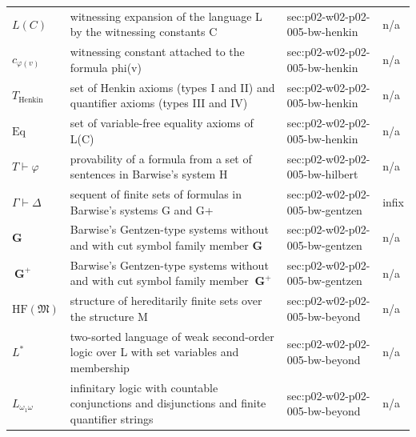 \begin{longtable}{@{}p{}p{}p{}p{}@{}}
\(L(C)\) & witnessing expansion of the language L by the witnessing constants C & sec:\allowbreak{}p02-\allowbreak{}w02-\allowbreak{}p02-\allowbreak{}005-\allowbreak{}bw-\allowbreak{}henkin & n/a \\
\(c_{\varphi(v)}\) & witnessing constant attached to the formula phi(v) & sec:\allowbreak{}p02-\allowbreak{}w02-\allowbreak{}p02-\allowbreak{}005-\allowbreak{}bw-\allowbreak{}henkin & n/a \\
\(T_{\mathrm{Henkin}}\) & set of Henkin axioms (types I and II) and quantifier axioms (types III and IV) & sec:\allowbreak{}p02-\allowbreak{}w02-\allowbreak{}p02-\allowbreak{}005-\allowbreak{}bw-\allowbreak{}henkin & n/a \\
\(\mathrm{Eq}\) & set of variable-free equality axioms of L(C) & sec:\allowbreak{}p02-\allowbreak{}w02-\allowbreak{}p02-\allowbreak{}005-\allowbreak{}bw-\allowbreak{}henkin & n/a \\
\(T\vdash\varphi\) & provability of a formula from a set of sentences in Barwise's system H & sec:\allowbreak{}p02-\allowbreak{}w02-\allowbreak{}p02-\allowbreak{}005-\allowbreak{}bw-\allowbreak{}hilbert & n/a \\
\(\Gamma\vdash\Delta\) & sequent of finite sets of formulas in Barwise's systems G and G+ & sec:\allowbreak{}p02-\allowbreak{}w02-\allowbreak{}p02-\allowbreak{}005-\allowbreak{}bw-\allowbreak{}gentzen & infix \\
\(\mathbf G\) & Barwise's Gentzen-type systems without and with cut symbol family member \(\mathbf G\) & sec:\allowbreak{}p02-\allowbreak{}w02-\allowbreak{}p02-\allowbreak{}005-\allowbreak{}bw-\allowbreak{}gentzen & n/a \\
\(\ \mathbf G^{+}\) & Barwise's Gentzen-type systems without and with cut symbol family member \(\ \mathbf G^{+}\) & sec:\allowbreak{}p02-\allowbreak{}w02-\allowbreak{}p02-\allowbreak{}005-\allowbreak{}bw-\allowbreak{}gentzen & n/a \\
\(\mathrm{HF}(\mathfrak M)\) & structure of hereditarily finite sets over the structure M & sec:\allowbreak{}p02-\allowbreak{}w02-\allowbreak{}p02-\allowbreak{}005-\allowbreak{}bw-\allowbreak{}beyond & n/a \\
\(L^{*}\) & two-sorted language of weak second-order logic over L with set variables and membership & sec:\allowbreak{}p02-\allowbreak{}w02-\allowbreak{}p02-\allowbreak{}005-\allowbreak{}bw-\allowbreak{}beyond & n/a \\
\(L_{\omega_1\omega}\) & infinitary logic with countable conjunctions and disjunctions and finite quantifier strings & sec:\allowbreak{}p02-\allowbreak{}w02-\allowbreak{}p02-\allowbreak{}005-\allowbreak{}bw-\allowbreak{}beyond & n/a \\

\end{longtable}
